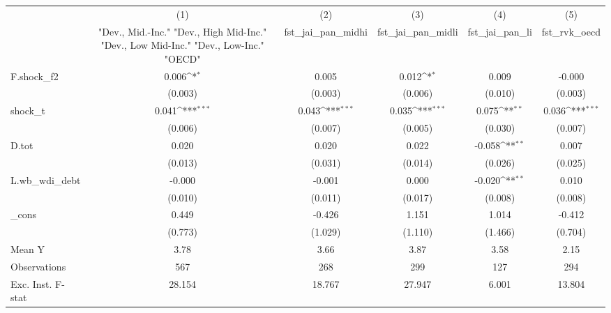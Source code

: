{
\def\sym#1{\ifmmode^{#1}\else\(^{#1}\)\fi}
\begin{tabular}{l*{5}{c}}
\toprule
            &\multicolumn{1}{c}{(1)}&\multicolumn{1}{c}{(2)}&\multicolumn{1}{c}{(3)}&\multicolumn{1}{c}{(4)}&\multicolumn{1}{c}{(5)}\\
            &\multicolumn{1}{c}{ "Dev., Mid.-Inc." "Dev., High Mid-Inc." "Dev., Low Mid-Inc." "Dev., Low-Inc." "OECD" }&\multicolumn{1}{c}{fst\_jai\_pan\_midhi}&\multicolumn{1}{c}{fst\_jai\_pan\_midli}&\multicolumn{1}{c}{fst\_jai\_pan\_li}&\multicolumn{1}{c}{fst\_rvk\_oecd}\\
\midrule
F.shock\_f2  &       0.006\sym{*}  &       0.005         &       0.012\sym{*}  &       0.009         &      -0.000         \\
            &     (0.003)         &     (0.003)         &     (0.006)         &     (0.010)         &     (0.003)         \\
\addlinespace
shock\_t     &       0.041\sym{***}&       0.043\sym{***}&       0.035\sym{***}&       0.075\sym{**} &       0.036\sym{***}\\
            &     (0.006)         &     (0.007)         &     (0.005)         &     (0.030)         &     (0.007)         \\
\addlinespace
D.tot       &       0.020         &       0.020         &       0.022         &      -0.058\sym{**} &       0.007         \\
            &     (0.013)         &     (0.031)         &     (0.014)         &     (0.026)         &     (0.025)         \\
\addlinespace
L.wb\_wdi\_debt&      -0.000         &      -0.001         &       0.000         &      -0.020\sym{**} &       0.010         \\
            &     (0.010)         &     (0.011)         &     (0.017)         &     (0.008)         &     (0.008)         \\
\addlinespace
\_cons      &       0.449         &      -0.426         &       1.151         &       1.014         &      -0.412         \\
            &     (0.773)         &     (1.029)         &     (1.110)         &     (1.466)         &     (0.704)         \\
\midrule
Mean Y      &        3.78         &        3.66         &        3.87         &        3.58         &        2.15         \\
Observations&         567         &         268         &         299         &         127         &         294         \\
Exc. Inst. F-stat&      28.154         &      18.767         &      27.947         &       6.001         &      13.804         \\
\bottomrule
\end{tabular}
}
